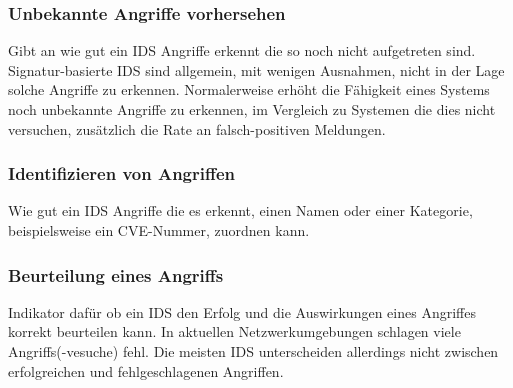\subsubsection{Unbekannte Angriffe vorhersehen}
Gibt an wie gut ein IDS Angriffe erkennt die so noch nicht aufgetreten sind. Signatur-basierte IDS sind allgemein, mit wenigen Ausnahmen, nicht in der Lage solche Angriffe zu erkennen. Normalerweise erhöht die Fähigkeit eines Systems noch unbekannte Angriffe zu erkennen, im Vergleich zu Systemen die dies nicht versuchen, zusätzlich die Rate an falsch-positiven Meldungen.
\subsubsection{Identifizieren von Angriffen}
Wie gut ein IDS Angriffe die es erkennt, einen Namen oder einer Kategorie, beispielsweise ein CVE-Nummer, zuordnen kann.
\subsubsection{Beurteilung  eines Angriffs}
Indikator dafür ob ein IDS den Erfolg und die Auswirkungen eines Angriffes korrekt beurteilen kann. In aktuellen Netzwerkumgebungen schlagen viele Angriffs(-vesuche) fehl. Die meisten IDS unterscheiden allerdings nicht zwischen erfolgreichen und fehlgeschlagenen Angriffen. 

